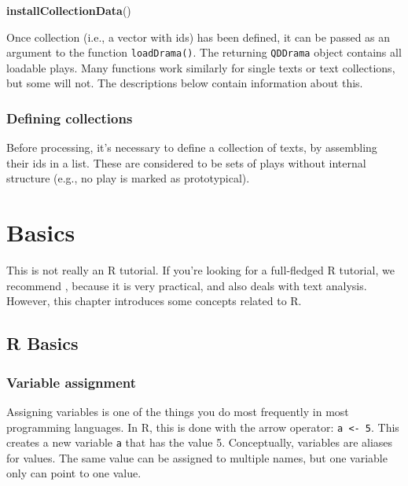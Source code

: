 \documentclass[]{book}
\newenvironment{Shaded}{\begin{snugshade}}{\end{snugshade}}
\newcommand{\KeywordTok}[1]{\textcolor[rgb]{0.13,0.29,0.53}{\textbf{#1}}}
\newcommand{\NormalTok}[1]{#1}
\begin{document}
\begin{Shaded}
\begin{Highlighting}[]
\KeywordTok{installCollectionData}\NormalTok{()}
\end{Highlighting}
\end{Shaded}

Once collection (i.e., a vector with ids) has been defined, it can be passed as an argument to the function \texttt{loadDrama()}. The returning \texttt{QDDrama} object contains all loadable plays. Many functions work similarly for single texts or text collections, but some will not. The descriptions below contain information about this.

\hypertarget{defining-collections}{%
\subsection{Defining collections}\label{defining-collections}}

Before processing, it's necessary to define a collection of texts, by assembling their ids in a list. These are considered to be sets of plays without internal structure (e.g., no play is marked as prototypical).

\hypertarget{basics}{%
\chapter{Basics}\label{basics}}

This is not really an R tutorial. If you're looking for a full-fledged R tutorial, we recommend \citep{Arnold:2015aa}, because it is very practical, and also deals with text analysis. However, this chapter introduces some concepts related to R.

\hypertarget{r-basics}{%
\section{R Basics}\label{r-basics}}

\hypertarget{variable-assignment}{%
\subsection{Variable assignment}\label{variable-assignment}}

Assigning variables is one of the things you do most frequently in most programming languages. In R, this is done with the arrow operator: \texttt{a\ \textless{}-\ 5}. This creates a new variable \texttt{a} that has the value 5. Conceptually, variables are aliases for values. The same value can be assigned to multiple names, but one variable only can point to one value.
\end{document}
